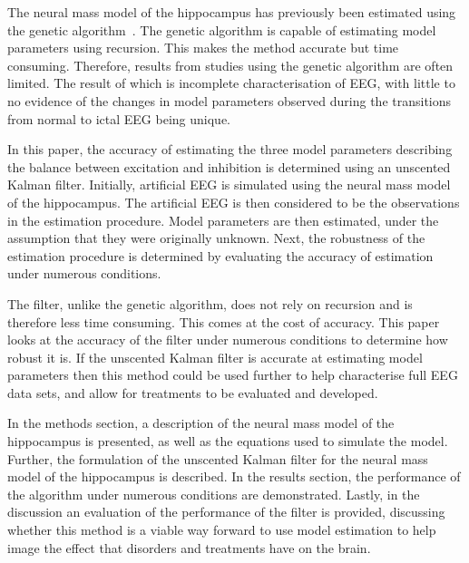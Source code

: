 The neural mass model of the hippocampus has previously been estimated using the genetic algorithm~\citep{wendling2005interictal}. The genetic algorithm is capable of estimating model parameters using recursion. This makes the method accurate but time consuming. Therefore, results from studies using the genetic algorithm are often limited. The result of which is incomplete characterisation of EEG, with little to no evidence of the changes in model parameters observed during the transitions from normal to ictal EEG being unique.





In this paper, the accuracy of estimating the three model parameters describing the balance between excitation and inhibition is determined using an unscented Kalman filter. Initially, artificial EEG is simulated using the neural mass model of the hippocampus. The artificial EEG is then considered to be the observations in the estimation procedure. Model parameters are then estimated, under the assumption that they were originally unknown. Next, the robustness of the estimation procedure is determined by evaluating the accuracy of estimation under numerous conditions.

The filter, unlike the genetic algorithm, does not rely on recursion and is therefore less time consuming. This comes at the cost of accuracy. This paper looks at the accuracy of the filter under numerous conditions to determine how robust it is. If the unscented Kalman filter is accurate at estimating model parameters then this method could be used further to help characterise full EEG data sets, and allow for treatments to be evaluated and developed.

In the methods section, a description of the neural mass model of the hippocampus is presented, as well as the equations used to simulate the model. Further, the formulation of the unscented Kalman filter for the neural mass model of the hippocampus is described. In the results section, the performance of the algorithm under numerous conditions are demonstrated. Lastly, in the discussion an evaluation of the performance of the filter is provided, discussing whether this method is a viable way forward to use model estimation to help image the effect that disorders and treatments have on the brain. 